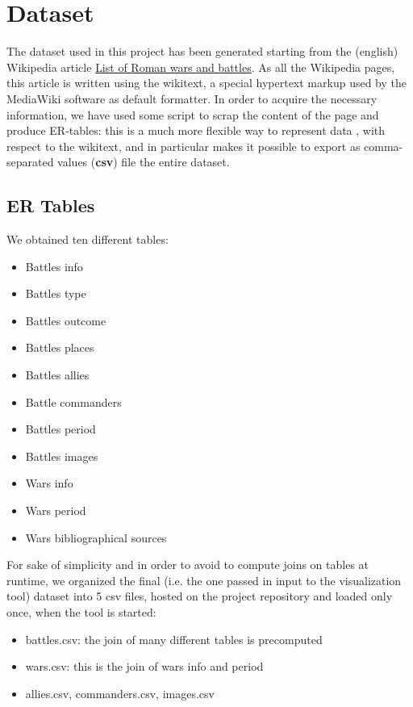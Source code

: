\section{Dataset}\label{sec:dataset}

The dataset used in this project has been generated starting from the (english) Wikipedia article \href{https://en.wikipedia.org/w/index.php?title=List_of_Roman_wars_and_battles}{List of Roman wars and battles}. As all the Wikipedia pages, this article is written using the wikitext, a special hypertext markup used by the MediaWiki software as default formatter. In order to acquire the necessary information, we have used some script to scrap the content of the page and produce ER-tables: this is a much more flexible way to represent data \cite{Chen76}, with respect to the wikitext, and in particular makes it possible to export as comma-separated values (\textbf{csv}) file the entire dataset.

\subsection{ER Tables}
We obtained ten different tables:
\begin{itemize}
    \item Battles info
    \item Battles type
    \item Battles outcome
    \item Battles places
    \item Battles allies
    \item Battle commanders
    \item Battles period
    \item Battles images
    \item Wars info
    \item Wars period
    \item Wars bibliographical sources
\end{itemize}

For sake of simplicity and in order to avoid to compute joins on tables at runtime, we organized the final (i.e. the one passed in input to the visualization tool) dataset into 5 csv files, hosted on the project repository and loaded only once, when the tool is started:
\begin{itemize}
    \item battles.csv: the join of many different tables is precomputed
    \item wars.csv: this is the join of wars info and period
    \item allies.csv, commanders.csv, images.csv
\end{itemize}

